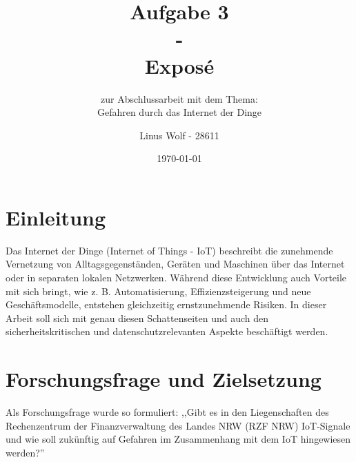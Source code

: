 \documentclass[12pt, a4paper, onecolumn, oneside, toc=bibliographynumbered, liststotoc]{scrartcl} %
\begin{document}
	\titlehead{Hochschule Rhein-Waal \\ %
	Fakultät: Kommunikation und Umwelt\\
	Studiengang: Verwaltungsinformatik\\
	Modul: Workshop 2: Wissenschaftliches Schreiben\\}
	\title{Aufgabe 3\\
	-\\
	Exposé} %
	\subtitle{zur Abschlussarbeit mit dem Thema:\\Gefahren durch das Internet der Dinge} %
	\author{Linus Wolf - 28611}
	\date{\today} %

\maketitle %


\newpage %

	\section{Einleitung}
Das Internet der Dinge (Internet of Things - IoT) beschreibt die zunehmende Vernetzung von Alltagsgegenständen, Geräten und Maschinen über das Internet oder in separaten lokalen Netzwerken. Während diese Entwicklung auch Vorteile mit sich bringt, wie z. B. Automatisierung, Effizienzsteigerung und neue Geschäftsmodelle, entstehen gleichzeitig ernstzunehmende Risiken. In dieser Arbeit soll sich mit genau diesen Schattenseiten und auch den sicherheitskritischen und datenschutzrelevanten Aspekte beschäftigt werden.

	\section{Forschungsfrage und Zielsetzung}
Als Forschungsfrage wurde so formuliert: ,,Gibt es in den Liegenschaften des Rechenzentrum der Finanzverwaltung des Landes NRW (RZF NRW) IoT-Signale und wie soll zukünftig auf Gefahren im Zusammenhang mit dem IoT hingewiesen werden?''
\end{document}
